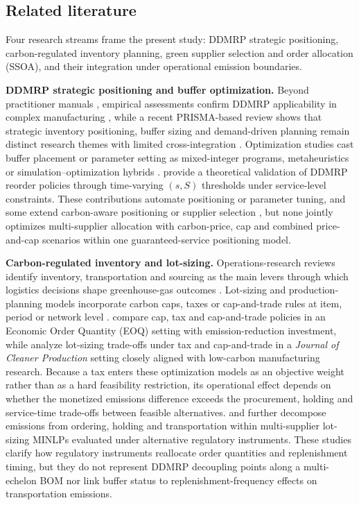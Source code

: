 \documentclass[preprint,12pt,authoryear]{elsarticle}
\begin{document}
\subsection{Related literature}\label{sec:lit}
Four research streams frame the present study: DDMRP strategic positioning, carbon-regulated inventory planning, green supplier selection and order allocation (SSOA), and their integration under operational emission boundaries.

\textbf{DDMRP strategic positioning and buffer optimization.}
Beyond practitioner manuals \citep{ptak2019}, empirical assessments confirm DDMRP applicability in complex manufacturing \citep{miclo2019,velasco2020}, while a recent PRISMA-based review shows that strategic inventory positioning, buffer sizing and demand-driven planning remain distinct research themes with limited cross-integration \citep{muyulema2025}. Optimization studies cast buffer placement or parameter setting as mixed-integer programs, metaheuristics or simulation--optimization hybrids \citep{achergui1,achergui2,lahrichi2022,damand2022,martin2023,habbadi2025,xu2023,younespour2024,krajcovic2024}. \citet{favaretto2023} provide a theoretical validation of DDMRP reorder policies through time-varying $(s,S)$ thresholds under service-level constraints. These contributions automate positioning or parameter tuning, and some extend carbon-aware positioning \citep{achergui3} or supplier selection \citep{ACHERGUI4}, but none jointly optimizes multi-supplier allocation with carbon-price, cap and combined price-and-cap scenarios within one guaranteed-service positioning model.

\textbf{Carbon-regulated inventory and lot-sizing.}
Operations-research reviews identify inventory, transportation and sourcing as the main levers through which logistics decisions shape greenhouse-gas outcomes \citep{dekker2012}. Lot-sizing and production-planning models incorporate carbon caps, taxes or cap-and-trade rules at item, period or network level \citep{absi2013,benjaafar2013,Choi2013,lamba2019cie,he2015,toptal2014}. \citet{toptal2014} compare cap, tax and cap-and-trade policies in an Economic Order Quantity (EOQ) setting with emission-reduction investment, while \citet{he2015} analyze lot-sizing trade-offs under tax and cap-and-trade in a \textit{Journal of Cleaner Production} setting closely aligned with low-carbon manufacturing research. Because a tax enters these optimization models as an objective weight rather than as a hard feasibility restriction, its operational effect depends on whether the monetized emissions difference exceeds the procurement, holding and service-time trade-offs between feasible alternatives. \citet{lamba2019tfsc} and \citet{chowdhury2020} further decompose emissions from ordering, holding and transportation within multi-supplier lot-sizing MINLPs evaluated under alternative regulatory instruments. These studies clarify how regulatory instruments reallocate order quantities and replenishment timing, but they do not represent DDMRP decoupling points along a multi-echelon BOM nor link buffer status to replenishment-frequency effects on transportation emissions.
\end{document}
